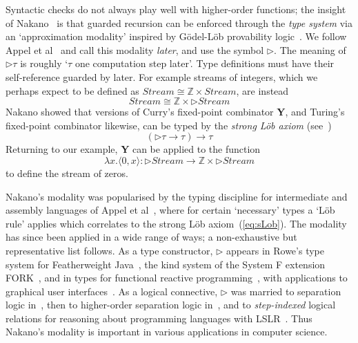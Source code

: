 \documentclass[envcountsect,envcountsame]{llncs}
\newcommand{\eqref}[1]{(\ref{#1})}
\newcommand{\limp}{\rightarrow}
\newcommand{\nxt}{\rhd}
\begin{document}
Syntactic checks do not always play well with higher-order functions; the insight
of Nakano~\cite{Nakano:Modality} is that guarded recursion can be enforced through
the \emph{type system} via an `approximation modality' inspired by
G\"odel-L\"ob provability logic~\cite{boolos-provability-logic}. We
follow Appel et al~\cite{Appel:Very} and call this modality \emph{later}, and use the
symbol $\nxt$. The meaning of $\nxt\tau$ is roughly `$\tau$ one computation step
later'. Type definitions must have their self-reference guarded by later. For
example streams of integers, which we perhaps expect to be defined as
$Stream \cong \mathbb{Z} \times Stream$, are instead
\[
  Stream \cong \mathbb{Z} \times \nxt Stream
\]
Nakano showed that versions of Curry's fixed-point combinator \textbf{Y}, and Turing's
fixed-point combinator likewise, can be typed by the \emph{strong L\"ob axiom}
(see~\cite{Litak:Constructive})
\begin{equation}\label{eq:sLob}
  (\nxt\tau\limp\tau)\to\tau
\end{equation}
Returning to our example, \textbf{Y} can be applied to the function
\[
  \lambda x.\langle 0,x\rangle:\nxt Stream\to \mathbb{Z}\times \nxt Stream
\]
to define the stream of zeros.

Nakano's modality was popularised by the typing discipline for intermediate
and assembly languages of Appel et al~\cite{Appel:Very}, where for certain
`necessary' types a `L\"ob rule' applies which correlates to the strong L\"ob
axiom~\eqref{eq:sLob}. The modality has since been applied in a wide range of ways;
a non-exhaustive but representative list follows.
As a type constructor, $\nxt$ appears in Rowe's type system for
Featherweight Java~\cite{Rowe:Semantic}, the kind system of the System F extension
FORK~\cite{Pottier:Typed}, and in types for functional reactive
programming~\cite{Krishnaswami:Ultrametric}, with applications to graphical user
interfaces~\cite{Krishnaswami:Semantic}. As a logical
connective, $\nxt$ was married to separation logic in~\cite{Hobor:Oracle},
then to higher-order separation logic in~\cite{Bengtson:Verifying}, and to
\emph{step-indexed} logical relations for reasoning about 
programming languages with LSLR~\cite{Dreyer:Logical}.
Thus Nakano's modality is important in various applications in
computer science.
\end{document}
